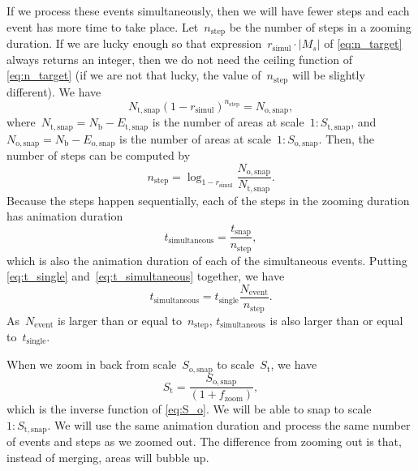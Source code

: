 \documentclass[twocolumn]{svjour3}          %
\begin{document}
If we process these events simultaneously, 
then we will have fewer steps and 
each event has more time to take place.
Let~$n_\mathrm{step}$ be the number of steps in a zooming duration.
If we are lucky enough so that
expression~$r_\mathrm{simul} \cdot |M_s|$ of \eq\ref{eq:n_target}
always returns an integer, 
then we do not need the ceiling function of \eq\ref{eq:n_target}
(if we are not that lucky, the value of~$n_\mathrm{step}$ will be slightly different).
We have 
\begin{equation*}
N_\mathrm{t,snap} (1-r_\mathrm{simul})^{n_\mathrm{step}} = N_\mathrm{o,snap},
\end{equation*}
where~$N_\mathrm{t,snap} = N_\mathrm{b}- E_\mathrm{t,snap}$ 
is the number of areas at scale~$1:S_\mathrm{t,snap}$,
and~$N_\mathrm{o,snap} = N_\mathrm{b}- E_\mathrm{o,snap}$
is the number of areas at scale~$1:S_\mathrm{o,snap}$.
Then, the number of steps can be computed by
\begin{equation*}
n_\mathrm{step} = \log_{1-r_\mathrm{simul}} 
    \frac{N_\mathrm{o,snap}}{N_\mathrm{t,snap}}.
\end{equation*}
Because the steps happen sequentially,
each of the steps in the zooming duration has
animation duration
\begin{equation}
\label{eq:t_simultaneous}
t_\mathrm{simultaneous} = \frac{t_\mathrm{snap}}{n_\mathrm{step}},
\end{equation}
which is also the animation duration of each of the simultaneous events.
Putting \eqs\ref{eq:t_single} and~\ref{eq:t_simultaneous} together,
we have
\begin{equation*}
\label{eq:t_compare_appx}
t_\mathrm{simultaneous} = t_\mathrm{single}  \frac{N_\mathrm{event}}{n_\mathrm{step}}.
\end{equation*}
As~$N_\mathrm{event}$ is larger than or equal to~$n_\mathrm{step}$,
$t_\mathrm{simultaneous}$ is also larger than or equal to~$t_\mathrm{single}$.


When we zoom in back from scale~$S_\mathrm{o,snap}$ to scale~$S_\mathrm{t}$, 
we have
\begin{equation*}
\label{eq:S_i}
S_\mathrm{t} = \frac{S_\mathrm{o,snap}}{(1 + f_\mathrm{zoom})},
\end{equation*}
which is the inverse function of \eq\ref{eq:S_o}.
We will be able to snap to scale~$1:S_\mathrm{t,snap}$.
We will use the same animation duration and 
process the same number of events and steps as we zoomed out.
The difference from zooming out is that, instead of merging, 
areas will bubble up.
\end{document}
